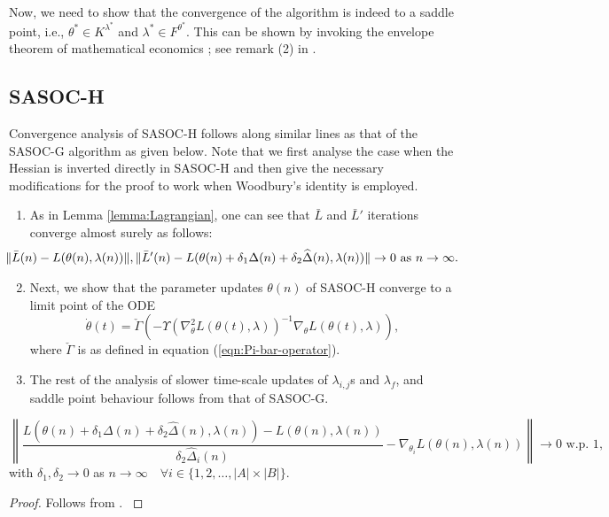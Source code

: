 \documentclass[11pt,letterpaper,english]{article}
\begin{document}
Now, we need to show that the convergence of the algorithm is indeed to a saddle point, i.e., $\theta^* \in K^{\lambda^*}$ and $\lambda^* \in F^{\theta^*}$. This can be shown by invoking the envelope theorem of mathematical economics \cite[pp. 964-966]{mas1995microeconomic}; see remark (2) in \cite[pp 15]{shalabh2011constrained}.

\subsection*{SASOC-H}
Convergence analysis of SASOC-H follows along similar lines as that of the SASOC-G algorithm as given below. Note that we first analyse the case when the Hessian is inverted directly in SASOC-H and then give the necessary modifications for the proof to work when Woodbury's identity is employed.
\begin{enumerate}
\item As in Lemma \ref{lemma:Lagrangian}, one can see that $\bar{L}$ and $\bar{L}'$ iterations converge almost surely as follows:
\begin{align*}
\hspace{-2em}\|\bar{L}(n) - L(\theta(n), \lambda(n)) \|, \|\bar{L}'(n) - L(\theta(n) + \delta_1 \Delta(n) + \delta_2 \widehat\Delta(n), \lambda(n)) \| \rightarrow 0 \textrm{ as } n \rightarrow \infty.
\end{align*}
\item Next, we show that the parameter updates $\theta(n)$ of SASOC-H converge to a limit point of the ODE
\begin{equation}
\label{eqn:sasoc-h:theta-ode}
\dot{\theta}(t) = \check{\Gamma}\left ( - \Upsilon(\nabla^2_\theta L(\theta(t), \lambda))^{-1} \nabla_\theta L(\theta(t), \lambda) \right ),
\end{equation}
where $\check{\Gamma}$ is as defined in equation (\ref{eqn:Pi-bar-operator}).
\item The rest of the analysis of slower time-scale updates of $\lambda_{i, j}$s and $\lambda_f$, and saddle point behaviour follows from that of SASOC-G.
\end{enumerate}

\begin{lemma}
\label{lemma:sasoc-h:gradient}
\[\left \| \dfrac{L(\theta(n) + \delta_1 \Delta(n) + \delta_2 \widehat\Delta(n), \lambda(n)) - L(\theta(n),\lambda(n))}{\delta_2 \widehat\Delta_i(n)} - \nabla_{\theta_{i}} L(\theta(n), \lambda(n)) \right \| \rightarrow 0\textrm{ w.p. 1},
\]
with $\delta_1, \delta_2 \rightarrow 0$ as $n \rightarrow \infty \quad \forall i \in \{1, 2, \dots, |A| \times |B| \}$.
\begin{proof}
{\rm
Follows from \cite[Proposition 4.10]{shalabh2011constrained}.
}
\end{proof}
\end{lemma}
\end{document}
